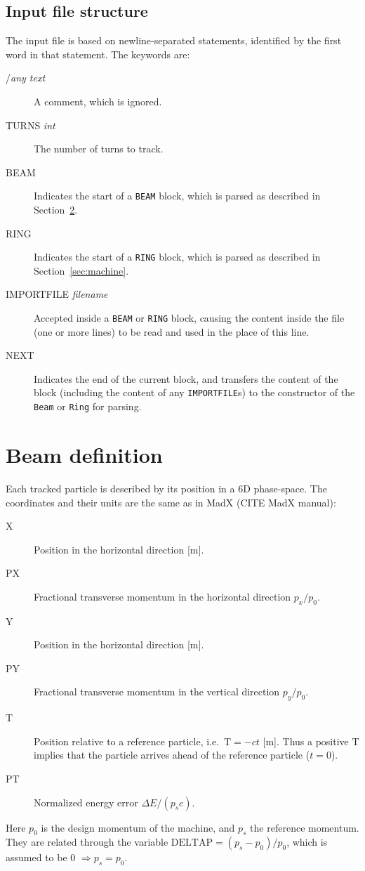 \documentclass[a4paper]{report}
\begin{document}
\section{Input file structure}
The input file is based on newline-separated statements, identified by the first word in that statement.
The keywords are:
\begin{description}
\item[/\textit{any text}] A comment, which is ignored.
\item[TURNS \textit{int}] The number of turns to track.
\item[BEAM] Indicates the start of a \texttt{BEAM} block, which is parsed as described in Section~\ref{sec:beam}.
\item[RING] Indicates the start of a \texttt{RING} block, which is parsed as described in Section~\ref{sec:machine}.
\item[IMPORTFILE \textit{filename}] Accepted inside a \texttt{BEAM} or \texttt{RING} block, causing the content inside the file (one or more lines) to be read and used in the place of this line.
\item[NEXT] Indicates the end of the current block, and transfers the content of the block (including the content of any \texttt{IMPORTFILE}s) to the constructor of the \texttt{Beam} or \texttt{Ring} for parsing.
\end{description}

\chapter{Beam definition}
\label{sec:beam}


Each tracked particle is described by its position in a 6D phase-space.
The coordinates and their units are the same as in MadX (CITE MadX manual):
\begin{description}
\item[X]  Position in the horizontal direction [m].
\item[PX] Fractional transverse momentum in the horizontal direction $p_x/p_0$.
\item[Y]  Position in the horizontal direction [m].
\item[PY] Fractional transverse momentum in the vertical direction $p_y/p_0$.
\item[T]  Position relative to a reference particle, i.e.\ $\mathrm{T}=-c t$ [m]. Thus a positive T implies that the particle arrives ahead of the reference particle ($t=0$).
\item[PT] Normalized energy error $\Delta E/(p_s c)$.
\end{description}
Here $p_0$ is the design momentum of the machine, and $p_s$ the reference momentum.
They are related through the variable $\mathrm{DELTAP} = (p_s-p_0)/p_0$, which is assumed to be 0 $\Rightarrow p_s=p_0$.
\end{document}
